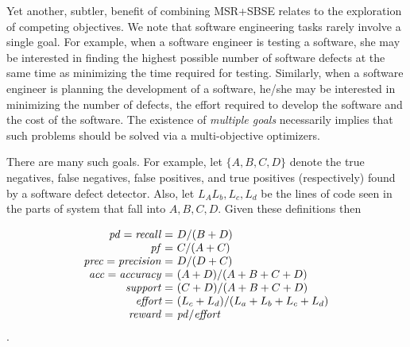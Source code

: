 \documentclass[table, xcdraw, sigconf,review, anonymous]{acmart}
\begin{document}
 Yet another, subtler, benefit of combining MSR+SBSE relates to the exploration of competing
 objectives.
 We note that  
 software engineering tasks rarely involve a
single goal. For example, when a software engineer
is testing a software, she may be interested in
finding the highest possible number of software
defects at the same time as minimizing the time
required for testing. Similarly, when a software
engineer is planning the development of a software,
he/she may be interested in minimizing the number of
defects, the effort required to develop the software
and the cost of the software. The existence of {\em
multiple goals} necessarily implies that such problems should be solved via
a   multi-objective optimizers.

There are many such goals. For example, 
let $\{A,B,C,D\}$ denote the
true negatives,
false negatives,
false positives, and
true positives
(respectively) found by a software defect detector.
Also, let $L_A L_b, L_c, L_d$ be the lines of code
seen in the parts of system that fall
into $A,B,C,D$. Given these definitions then


{\small\[
\begin{array}{r@{~}l}
\mathit{pd}=\mathit{recall}=&D / (B+D)\\
\mathit{pf}=&C / (A+C)\\
\mathit{prec}=\mathit{precision}=&D / (D+C)\\
\mathit{acc}=\mathit{accuracy}=&(A+D) / (A+B+C+D)\\
\mathit{support}=&(C+D) / (A+B+C+D)\\
\textit{effort}=&(L_c+L_d) / (L_a + L_b + L_c + L_d)\\
\mathit{reward}=&\mathit{pd} / \textit{effort}
\end{array}
\]}.
\end{document}
